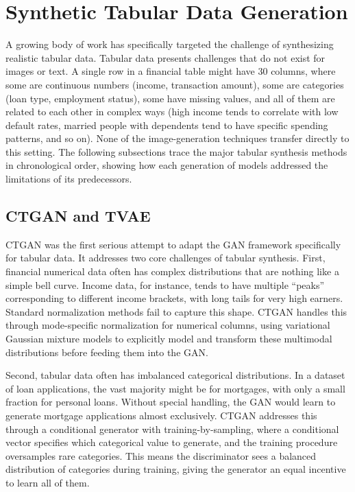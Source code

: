\section{Synthetic Tabular Data Generation}

A growing body of work has specifically targeted the challenge of synthesizing realistic tabular data. Tabular data presents challenges that do not exist for images or text. A single row in a financial table might have 30 columns, where some are continuous numbers (income, transaction amount), some are categories (loan type, employment status), some have missing values, and all of them are related to each other in complex ways (high income tends to correlate with low default rates, married people with dependents tend to have specific spending patterns, and so on). None of the image-generation techniques transfer directly to this setting. The following subsections trace the major tabular synthesis methods in chronological order, showing how each generation of models addressed the limitations of its predecessors.

\subsection{CTGAN and TVAE}

CTGAN \cite{xu2019ctgan} was the first serious attempt to adapt the GAN framework specifically for tabular data. It addresses two core challenges of tabular synthesis. First, financial numerical data often has complex distributions that are nothing like a simple bell curve. Income data, for instance, tends to have multiple ``peaks'' corresponding to different income brackets, with long tails for very high earners. Standard normalization methods fail to capture this shape. CTGAN handles this through mode-specific normalization for numerical columns, using variational Gaussian mixture models to explicitly model and transform these multimodal distributions before feeding them into the GAN.

Second, tabular data often has imbalanced categorical distributions. In a dataset of loan applications, the vast majority might be for mortgages, with only a small fraction for personal loans. Without special handling, the GAN would learn to generate mortgage applications almost exclusively. CTGAN addresses this through a conditional generator with training-by-sampling, where a conditional vector specifies which categorical value to generate, and the training procedure oversamples rare categories. This means the discriminator sees a balanced distribution of categories during training, giving the generator an equal incentive to learn all of them.

